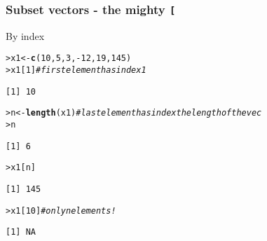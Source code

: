 \documentclass[13pt,aspectratio=169]{beamer}\usepackage[]{graphicx}\usepackage[]{color}
\makeatletter
\newcommand{\hlnum}[1]{\textcolor[rgb]{0.686,0.059,0.569}{#1}}%
\newcommand{\hlcom}[1]{\textcolor[rgb]{0.678,0.584,0.686}{\textit{#1}}}%
\newcommand{\hlopt}[1]{\textcolor[rgb]{0,0,0}{#1}}%
\newcommand{\hlstd}[1]{\textcolor[rgb]{0.345,0.345,0.345}{#1}}%
\newcommand{\hlkwb}[1]{\textcolor[rgb]{0.69,0.353,0.396}{#1}}%
\newcommand{\hlkwd}[1]{\textcolor[rgb]{0.737,0.353,0.396}{\textbf{#1}}}%
\newenvironment{kframe}{%
 \def\at@end@of@kframe{}%
 \ifinner\ifhmode%
  \def\at@end@of@kframe{\end{minipage}}%
  \begin{minipage}{\columnwidth}%
 \fi\fi%
 \def\FrameCommand##1{\hskip\@totalleftmargin \hskip-\fboxsep
 \colorbox{shadecolor}{##1}\hskip-\fboxsep
     \hskip-\linewidth \hskip-\@totalleftmargin \hskip\columnwidth}%
 \MakeFramed {\advance\hsize-\width
   \@totalleftmargin\z@ \linewidth\hsize
   \@setminipage}}%
 {\par\unskip\endMakeFramed%
 \at@end@of@kframe}
\newenvironment{knitrout}{}{} %
\renewcommand{\tt}[1]{\texttt{#1}}
\renewenvironment{knitrout}{\setlength{\topsep}{0mm}}{}
\makeatother
\begin{document}
\begin{frame}[fragile]
    \frametitle{Subset vectors - the mighty \tt{[}}
\vskip10pt
By index
\vskip10pt
\begin{knitrout}\small
{}\color{fgcolor}\begin{kframe}
\begin{alltt}
\hlstd{> }\hlstd{x1} \hlkwb{<-} \hlkwd{c}\hlstd{(}\hlnum{10}\hlstd{,} \hlnum{5}\hlstd{,} \hlnum{3}\hlstd{,} \hlopt{-}\hlnum{12}\hlstd{,} \hlnum{19}\hlstd{,} \hlnum{145}\hlstd{)}
\hlstd{> }\hlstd{x1[}\hlnum{1}\hlstd{]} \hlcom{# first element has index 1}
\end{alltt}
\begin{verbatim}
[1] 10
\end{verbatim}
\begin{alltt}
\hlstd{> }\hlstd{n} \hlkwb{<-} \hlkwd{length}\hlstd{(x1)} \hlcom{# last element has index the length of the vec}
\hlstd{> }\hlstd{n}
\end{alltt}
\begin{verbatim}
[1] 6
\end{verbatim}
\begin{alltt}
\hlstd{> }\hlstd{x1[n]}
\end{alltt}
\begin{verbatim}
[1] 145
\end{verbatim}
\begin{alltt}
\hlstd{> }\hlstd{x1[}\hlnum{10}\hlstd{]} \hlcom{# only n elements!}
\end{alltt}
\begin{verbatim}
[1] NA
\end{verbatim}
\end{kframe}
\end{knitrout}
\end{frame}
\end{document}

